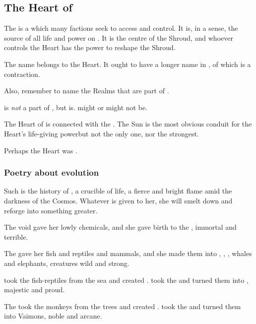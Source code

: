 \subsection{The Heart of \Miith}
The  is a \dweomer{} which many factions seek to access and control. 
It is, in a sense, the source of all life and power on \Miith{}. 
It is the centre of the Shroud, and whoever controls the Heart has the power to reshape the Shroud. 

The name \quo{\Miith} belongs to the Heart. 
It ought to have a longer name in \draconic, of which \quo{\Miith} is a contraction. 

Also, remember to name the Realms that are part of \Miith{}. 

\Erebos{} is \emph{not} a part of \Miith{}, but \Nyx{} is. \Machai{} might or might not be. 

The Heart of \Miith{} is connected with the . The Sun is the most obvious conduit for the Heart's life-giving power\dash but not the only one, nor the strongest. 

Perhaps the Heart was . 









\subsubsection{Poetry about evolution}
Such is the history of \Miith{}, a crucible of life, a fierce and bright flame amid the darkness of the Cosmos. Whatever is given to her, she will smelt down and reforge into something greater. 

The void gave her lowly chemicals, and she gave birth to the \krakens{}, immortal and terrible. 

The \voyagers{} gave her fish and reptiles and mammals, and she made them into \caderyns, \nycans{}, \cortios{}, whales and elephants, creatures wild and strong. 

\Moroch{} took the fish-reptiles from the sea and created \nagae{}. \Miith{} took the \nagae{} and turned them into \dragons{}, majestic and proud. 

The \banes{} took the monkeys from the trees and created \humans{}. \Miith{} took the \humans{} and turned them into Vaimons, noble and arcane. 

